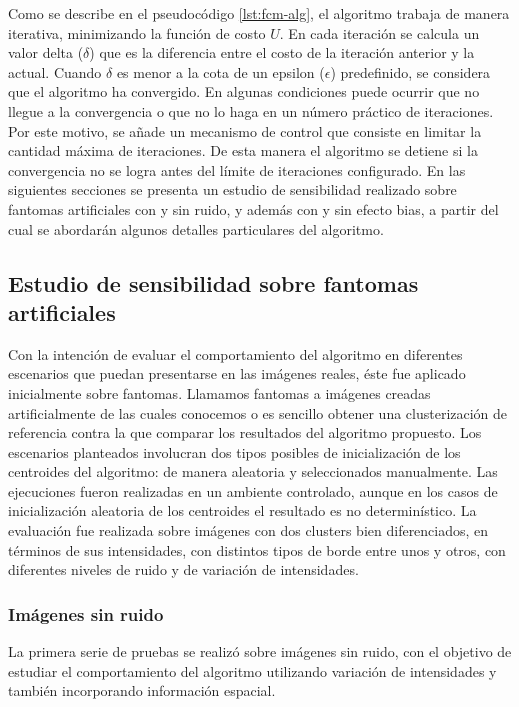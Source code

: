 Como se describe en el pseudocódigo \ref{lst:fcm-alg}, el algoritmo trabaja de manera iterativa, minimizando la función de costo $U$. En cada iteración se calcula un valor delta ($\delta$) que es la diferencia entre el costo de la iteración anterior y la actual. Cuando $\delta$ es menor a la cota de un epsilon ($\epsilon$) predefinido, se considera que el algoritmo ha convergido. En algunas condiciones puede ocurrir que no llegue a la convergencia o que no lo haga en un número práctico de iteraciones. Por este motivo, se añade un mecanismo de control que consiste en limitar la cantidad máxima de iteraciones. De esta manera el algoritmo se detiene si la convergencia no se logra antes del límite de iteraciones configurado.
En las siguientes secciones se presenta un estudio de sensibilidad realizado sobre fantomas artificiales con y sin ruido, y además con y sin efecto bias, a partir del cual se abordarán algunos detalles particulares del algoritmo.

\subsection{Estudio de sensibilidad sobre fantomas artificiales}
Con la intención de evaluar el comportamiento del algoritmo en diferentes escenarios que puedan presentarse en las imágenes reales, éste fue aplicado inicialmente sobre fantomas. Llamamos fantomas a imágenes creadas artificialmente de las cuales conocemos o es sencillo obtener una clusterización de referencia contra la que comparar los resultados del algoritmo propuesto. Los escenarios planteados involucran dos tipos posibles de inicialización de los centroides del algoritmo: de manera aleatoria y seleccionados manualmente. Las ejecuciones fueron realizadas en un ambiente controlado, aunque en los casos de inicialización aleatoria de los centroides el resultado es no determinístico. La evaluación fue realizada sobre imágenes con dos clusters bien diferenciados, en términos de sus intensidades, con distintos tipos de borde entre unos y otros, con diferentes niveles de ruido y de variación de intensidades.

\subsubsection{Imágenes sin ruido}
La primera serie de pruebas se realizó sobre imágenes sin ruido, con el objetivo de estudiar el comportamiento del algoritmo utilizando variación de intensidades y también incorporando información espacial.

